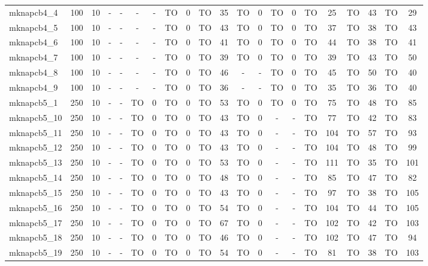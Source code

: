 \begin{sidewaystable}[!ht]
{\begin{tabular}{lcccccccccccccccccccc}
mknapcb4\_4 & 100 & 10 &  - &  - &  - &  - & TO & 0 & TO & 35 & TO & 0 & TO & 0 & TO & 25 & TO & 43 & TO & 29 \\
mknapcb4\_5 & 100 & 10 &  - &  - &  - &  - & TO & 0 & TO & 43 & TO & 0 & TO & 0 & TO & 37 & TO & 38 & TO & 43 \\
mknapcb4\_6 & 100 & 10 &  - &  - &  - &  - & TO & 0 & TO & 41 & TO & 0 & TO & 0 & TO & 44 & TO & 38 & TO & 41 \\
mknapcb4\_7 & 100 & 10 &  - &  - &  - &  - & TO & 0 & TO & 39 & TO & 0 & TO & 0 & TO & 39 & TO & 43 & TO & 50 \\
mknapcb4\_8 & 100 & 10 &  - &  - &  - &  - & TO & 0 & TO & 46 &  - &  - & TO & 0 & TO & 45 & TO & 50 & TO & 40 \\
mknapcb4\_9 & 100 & 10 &  - &  - &  - &  - & TO & 0 & TO & 36 &  - &  - & TO & 0 & TO & 35 & TO & 36 & TO & 40 \\
mknapcb5\_1 & 250 & 10 &  - &  - & TO & 0 & TO & 0 & TO & 53 & TO & 0 & TO & 0 & TO & 75 & TO & 48 & TO & 85 \\
mknapcb5\_10 & 250 & 10 &  - &  - & TO & 0 & TO & 0 & TO & 43 & TO & 0 &  - &  - & TO & 77 & TO & 42 & TO & 83 \\
mknapcb5\_11 & 250 & 10 &  - &  - & TO & 0 & TO & 0 & TO & 43 & TO & 0 &  - &  - & TO & 104 & TO & 57 & TO & 93 \\
mknapcb5\_12 & 250 & 10 &  - &  - & TO & 0 & TO & 0 & TO & 43 & TO & 0 &  - &  - & TO & 104 & TO & 48 & TO & 99 \\
mknapcb5\_13 & 250 & 10 &  - &  - & TO & 0 & TO & 0 & TO & 53 & TO & 0 &  - &  - & TO & 111 & TO & 35 & TO & 101 \\
mknapcb5\_14 & 250 & 10 &  - &  - & TO & 0 & TO & 0 & TO & 48 & TO & 0 &  - &  - & TO & 85 & TO & 47 & TO & 82 \\
mknapcb5\_15 & 250 & 10 &  - &  - & TO & 0 & TO & 0 & TO & 43 & TO & 0 &  - &  - & TO & 97 & TO & 38 & TO & 105 \\
mknapcb5\_16 & 250 & 10 &  - &  - & TO & 0 & TO & 0 & TO & 54 & TO & 0 &  - &  - & TO & 104 & TO & 44 & TO & 105 \\
mknapcb5\_17 & 250 & 10 &  - &  - & TO & 0 & TO & 0 & TO & 67 & TO & 0 &  - &  - & TO & 102 & TO & 42 & TO & 103 \\
mknapcb5\_18 & 250 & 10 &  - &  - & TO & 0 & TO & 0 & TO & 46 & TO & 0 &  - &  - & TO & 102 & TO & 47 & TO & 94 \\
mknapcb5\_19 & 250 & 10 &  - &  - & TO & 0 & TO & 0 & TO & 54 & TO & 0 &  - &  - & TO & 81 & TO & 38 & TO & 103 \\

\end{tabular}}
\end{sidewaystable}
